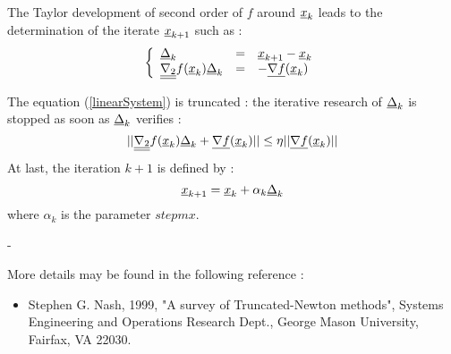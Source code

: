 {  The Taylor development of second order of $f$ around  ${\underline{x}}_k$ leads to the determination of the iterate ${\underline{x}}_{k+1}$ such as :
  \begin{equation}\label{linearSystem}
    \left\{
      \begin{array}{lcl}
        {\underline{\Delta}}_k & = & {\underline{x}}_{k+1} - {\underline{x}}_k  \\
        {\underline{\underline{\nabla_2}}} f({\underline{x}}_k){\underline{\Delta}}_k & = & -{\underline{\nabla f}}({\underline{x}}_k)
      \end{array}
    \right.
  \end{equation}

  The equation (\ref{linearSystem}) is truncated : the iterative research of ${\underline{\Delta}}_k$ is stopped as soon as ${\underline{\Delta}}_k$ verifies :
  $$
  || {\underline{\underline{\nabla_2}}} f({\underline{x}}_k){\underline{\Delta}}_k + {\underline{\nabla f}}({\underline{x}}_k) || \leq \eta ||{\underline{\nabla f}}({\underline{x}}_k) ||
  $$
  At last, the iteration $k+1$ is defined by :
  $$
  {\underline{x}}_{k+1} = {\underline{x}}_k + \alpha_k {\underline{\Delta}}_k
  $$
  where $\alpha_k$ is the parameter $stepmx$.



}
{
  -
}

{
  More details may be found in the following reference :
  \begin{itemize}
  \item Stephen G. Nash, 1999, "A survey of Truncated-Newton methods", Systems Engineering and Operations Research Dept., George Mason University, Fairfax, VA 22030.
  \end{itemize}
}


